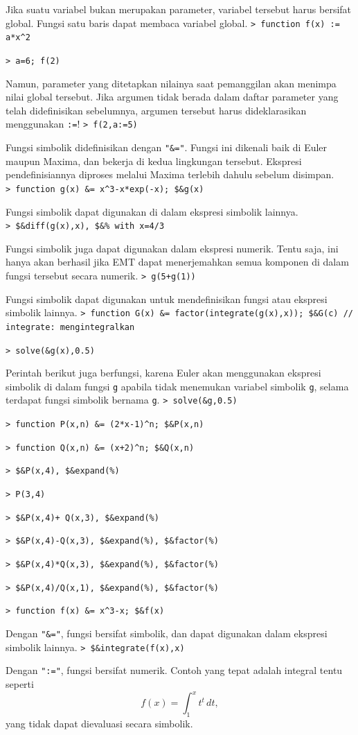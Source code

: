 \documentclass[11pt, a4paper]{article}
\newcommand{\emtcmd}[1]{\noindent\texttt{\textcolor{emtcommand}{>}\ #1}\par\smallskip}
\begin{document}
Jika suatu variabel bukan merupakan parameter, variabel tersebut harus bersifat global. Fungsi satu baris dapat membaca variabel global.
\emtcmd{function f(x) := a*x\^{}2}
\emtcmd{a=6; f(2)}

Namun, parameter yang ditetapkan nilainya saat pemanggilan akan menimpa nilai global tersebut. Jika argumen tidak berada dalam daftar parameter yang telah didefinisikan sebelumnya, argumen tersebut harus dideklarasikan menggunakan \texttt{:=}!
\emtcmd{f(2,a:=5)}

Fungsi simbolik didefinisikan dengan \texttt{"\&="}. Fungsi ini dikenali baik di Euler maupun Maxima, dan bekerja di kedua lingkungan tersebut. Ekspresi pendefinisiannya diproses melalui Maxima terlebih dahulu sebelum disimpan.
\emtcmd{function g(x) \&= x\^{}3-x*exp(-x); \$\&g(x)}

Fungsi simbolik dapat digunakan di dalam ekspresi simbolik lainnya.
\emtcmd{\$\&diff(g(x),x), \$\&\% with x=4/3}

Fungsi simbolik juga dapat digunakan dalam ekspresi numerik. Tentu saja, ini hanya akan berhasil jika EMT dapat menerjemahkan semua komponen di dalam fungsi tersebut secara numerik.
\emtcmd{g(5+g(1))}

Fungsi simbolik dapat digunakan untuk mendefinisikan fungsi atau ekspresi simbolik lainnya.
\emtcmd{function G(x) \&= factor(integrate(g(x),x)); \$\&G(c) \textcolor{emtcomment}{// integrate: mengintegralkan}}
\emtcmd{solve(\&g(x),0.5)}

Perintah berikut juga berfungsi, karena Euler akan menggunakan ekspresi simbolik di dalam fungsi \texttt{g} apabila tidak menemukan variabel simbolik \texttt{g}, selama terdapat fungsi simbolik bernama \texttt{g}.
\emtcmd{solve(\&g,0.5)}
\emtcmd{function P(x,n) \&= (2*x-1)\^{}n; \$\&P(x,n)}
\emtcmd{function Q(x,n) \&= (x+2)\^{}n; \$\&Q(x,n)}
\emtcmd{\$\&P(x,4), \$\&expand(\%)}
\emtcmd{P(3,4)}
\emtcmd{\$\&P(x,4)+ Q(x,3), \$\&expand(\%)}
\emtcmd{\$\&P(x,4)-Q(x,3), \$\&expand(\%), \$\&factor(\%)}
\emtcmd{\$\&P(x,4)*Q(x,3), \$\&expand(\%), \$\&factor(\%)}
\emtcmd{\$\&P(x,4)/Q(x,1), \$\&expand(\%), \$\&factor(\%)}
\emtcmd{function f(x) \&= x\^{}3-x; \$\&f(x)}

Dengan \texttt{"\&="}, fungsi bersifat simbolik, dan dapat digunakan dalam ekspresi simbolik lainnya.
\emtcmd{\$\&integrate(f(x),x)}

Dengan \texttt{":="}, fungsi bersifat numerik. Contoh yang tepat adalah integral tentu seperti
$$f(x) = \int_1^x t^t \, dt,$$
yang tidak dapat dievaluasi secara simbolik.
\end{document}
